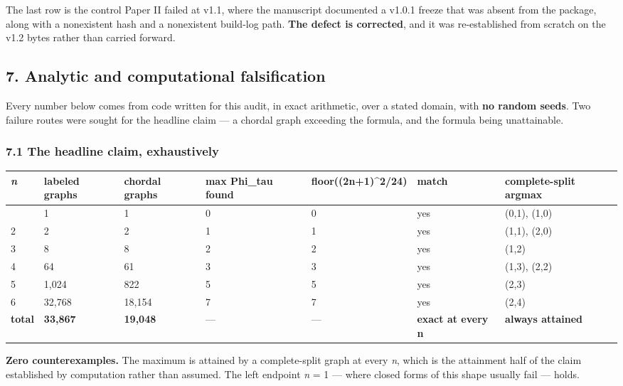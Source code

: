 \documentclass[
  9pt,
  a4paper,
]{article}
\newcounter{none} %
\begin{document}
The last row is the control Paper II failed at v1.1, where the
manuscript documented a v1.0.1 freeze that was absent from the package,
along with a nonexistent hash and a nonexistent build-log path.
\textbf{The defect is corrected}, and it was re-established from scratch
on the v1.2 bytes rather than carried forward.

\subsection{7. Analytic and computational
falsification}\label{7-analytic-and-computational-falsification}

Every number below comes from code written for this audit, in exact
arithmetic, over a stated domain, with \textbf{no random seeds}. Two
failure routes were sought for the headline claim --- a chordal graph
exceeding the formula, and the formula being unattainable.

\subsubsection{7.1 The headline claim,
exhaustively}\label{71-the-headline-claim-exhaustively}

{\def\LTcaptype{none} %
\begin{longtable}[]{@{}lllllll@{}}
\toprule\noalign{}
\emph{n} & labeled graphs & chordal graphs & max Phi\_tau found &
floor((2n+1)\^{}2/24) & match & complete-split argmax \\
\midrule\noalign{}
\endhead
\bottomrule\noalign{}
\endlastfoot
1 & 1 & 1 & 0 & 0 & yes & (0,1), (1,0) \\
2 & 2 & 2 & 1 & 1 & yes & (1,1), (2,0) \\
3 & 8 & 8 & 2 & 2 & yes & (1,2) \\
4 & 64 & 61 & 3 & 3 & yes & (1,3), (2,2) \\
5 & 1,024 & 822 & 5 & 5 & yes & (2,3) \\
6 & 32,768 & 18,154 & 7 & 7 & yes & (2,4) \\
\textbf{total} & \textbf{33,867} & \textbf{19,048} & --- & --- &
\textbf{exact at every n} & \textbf{always attained} \\
\end{longtable}
}

\textbf{Zero counterexamples.} The maximum is attained by a
complete-split graph at every \emph{n}, which is the attainment half of
the claim established by computation rather than assumed. The left
endpoint \emph{n} = 1 --- where closed forms of this shape usually fail
--- holds.
\end{document}
